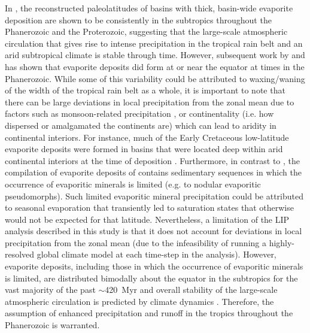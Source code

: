 \documentclass[11pt,letterpaper]{article}
\begin{document}
In \citet{Evans2006a}, the reconstructed paleolatitudes of basins with thick, basin-wide evaporite deposition are shown to be consistently in the subtropics throughout the Phanerozoic and the Proterozoic, suggesting that the large-scale atmospheric circulation that gives rise to intense precipitation in the tropical rain belt and an arid subtropical climate is stable through time. However, subsequent work by \citet{Boucot2013a} and \citet{Cao2018a} has shown that evaporite deposits did form at or near the equator at times in the Phanerozoic. While some of this variability could be attributed to waxing/waning of the width of the tropical rain belt as a whole, it is important to note that there can be large deviations in local precipitation from the zonal mean due to factors such as monsoon-related precipitation \citep{Trenberth2000a}, or continentality (i.e. how dispersed or amalgamated the continents are) which can lead to aridity in continental interiors. For instance, much of the Early Cretaceous low-latitude evaporite deposits were formed in basins that were located deep within arid continental interiors at the time of deposition \citep{Boucot2013a, Cao2018a}. Furthermore, in contrast to \citet{Evans2006a}, the compilation of evaporite deposits of \citet{Boucot2013a} contains sedimentary sequences in which the occurrence of evaporitic minerals is limited (e.g. to nodular evaporitic pseudomorphs). Such limited evaporitic mineral precipitation could be attributed to seasonal evaporation that transiently led to saturation states that otherwise would not be expected for that latitude. Nevertheless, a limitation of the LIP analysis described in this study is that it does not account for deviations in local precipitation from the zonal mean (due to the infeasibility of running a highly-resolved global climate model at each time-step in the analysis). However, evaporite deposits, including those in which the occurrence of evaporitic minerals is limited, are distributed bimodally about the equator in the subtropics for the vast majority of the past $\sim$420~Myr \citep{Cao2018a} and overall stability of the large-scale atmospheric circulation is predicted by climate dynamics \citep{Donohoe2017a}. Therefore, the assumption of enhanced precipitation and runoff in the tropics throughout the Phanerozoic is warranted.
\end{document}
